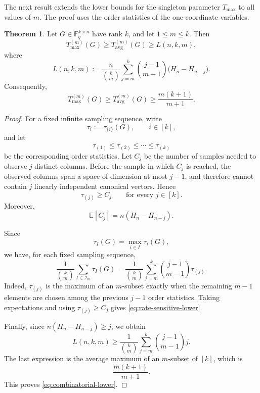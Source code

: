 \documentclass[11pt,a4paper]{article}
\numberwithin{equation}{section}
\theoremstyle{definition}
\theoremstyle{definition}
\newtheorem{theorem}[definition]{Theorem}
\newcommand{\F}{\mathbb{F}}
\newcommand{\E}{\mathbb{E}}
\newcommand{\cI}{\mathcal{I}}
\newcommand{\Tmax}{T_{\max}}
\newcommand{\Tavg}{T_{\mathrm{avg}}}
\begin{document}
The next result extends the lower bounds for the singleton parameter $\Tmax$ to all values of $m$.  The proof uses the order statistics of the one-coordinate variables.

\begin{theorem}\label{thm:universal-lower-bounds}
Let $G\in \F_q^{k\times n}$ have rank $k$, and let $1\leq m\leq k$.  Then
\begin{equation}\label{eq:rate-sensitive-lower}
\Tmax^{(m)}(G)
\geq
\Tavg^{(m)}(G)
\geq
L(n,k,m),
\end{equation}
where
\begin{equation}\label{eq:def-Lnkm}
L(n,k,m):=
\frac{n}{\binom{k}{m}}
\sum_{j=m}^{k}
\binom{j-1}{m-1}
\bigl(H_n-H_{n-j}\bigr).
\end{equation}
Consequently,
\begin{equation}\label{eq:combinatorial-lower}
\Tmax^{(m)}(G)
\geq
\Tavg^{(m)}(G)
\geq
\frac{m(k+1)}{m+1}.
\end{equation}
\end{theorem}

\begin{proof}
For a fixed infinite sampling sequence, write
\[
\tau_i:=\tau_{\{i\}}(G),\qquad i\in [k],
\]
and let
\[
\tau_{(1)}\leq \tau_{(2)}\leq \cdots\leq \tau_{(k)}
\]
be the corresponding order statistics.  Let $C_j$ be the number of samples needed to observe $j$ distinct columns.  Before the sample in which $C_j$ is reached, the observed columns span a space of dimension at most $j-1$, and therefore cannot contain $j$ linearly independent canonical vectors.  Hence
\[
\tau_{(j)}\geq C_j
\qquad\text{for every }j\in [k].
\]
Moreover,
\[
\E[C_j]=n(H_n-H_{n-j}).
\]

Since
\[
\tau_I(G)=\max_{i\in I}\tau_i(G),
\]
we have, for each fixed sampling sequence,
\[
\frac{1}{\binom{k}{m}}\sum_{I\in \cI_m}\tau_I(G)
=
\frac{1}{\binom{k}{m}}
\sum_{j=m}^{k}\binom{j-1}{m-1}\tau_{(j)}.
\]
Indeed, $\tau_{(j)}$ is the maximum of an $m$-subset exactly when the remaining $m-1$ elements are chosen among the previous $j-1$ order statistics.  Taking expectations and using $\tau_{(j)}\geq C_j$ gives \eqref{eq:rate-sensitive-lower}.

Finally, since $n(H_n-H_{n-j})\geq j$, we obtain
\[
L(n,k,m)
\geq
\frac{1}{\binom{k}{m}}
\sum_{j=m}^{k}\binom{j-1}{m-1}j.
\]
The last expression is the average maximum of an $m$-subset of $[k]$, which is
\[
\frac{m(k+1)}{m+1}.
\]
This proves \eqref{eq:combinatorial-lower}.
\end{proof}
\end{document}
